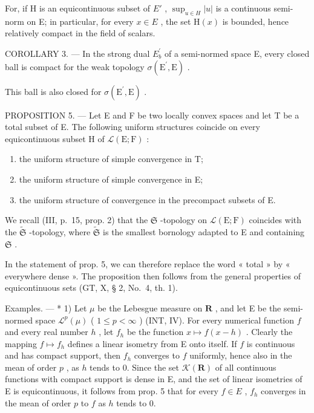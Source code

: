 For, if H is an equicontinuous subset of \(E'\) , \(\sup_{u\in H}|u|\) is a continuous semi-norm on E; in particular, for every \(x\in E\) , the set \(\mathrm{H}(x)\) is bounded, hence relatively compact in the field of scalars.

COROLLARY 3. --- In the strong dual \(E_{b}^{\prime}\) of a semi-normed space E, every closed ball is compact for the weak topology \(\sigma(\mathrm{E}^{\prime},\mathrm{E})\) .

This ball is also closed for \(\sigma(\mathrm{E}^{\prime},\mathrm{E})\) .

PROPOSITION 5. --- Let E and F be two locally convex spaces and let T be a total subset of E. The following uniform structures coincide on every equicontinuous subset H of \(\mathcal{L}(\mathrm{E};\mathrm{F})\) :

\begin{enumerate}
\def\labelenumi{\arabic{enumi})}
\item
  the uniform structure of simple convergence in T;
\item
  the uniform structure of simple convergence in E;
\item
  the uniform structure of convergence in the precompact subsets of E.
\end{enumerate}

We recall (III, p.~15, prop. 2) that the \(\mathfrak{S}\) -topology on \(\mathcal{L}(\mathrm{E};\mathrm{F})\) coincides with the \(\tilde{\mathfrak{S}}\) -topology, where \(\tilde{\mathfrak{S}}\) is the smallest bornology adapted to E and containing \(\mathfrak{S}\) .

In the statement of prop. 5, we can therefore replace the word « total » by « everywhere dense ». The proposition then follows from the general properties of equicontinuous sets (GT, X, § 2, No.~4, th. 1).

Examples. --- * 1) Let \(\mu\) be the Lebesgue measure on \(\mathbf{R}\) , and let E be the semi-normed space \(\mathcal{L}^p(\mu)\) ( \(1 \leqslant p < \infty\) ) (INT, IV). For every numerical function \(f\) and every real number \(h\) , let \(f_h\) be the function \(x \mapsto f(x - h)\) . Clearly the mapping \(f \mapsto f_h\) defines a linear isometry from E onto itself. If \(f\) is continuous and has compact support, then \(f_h\) converges to \(f\) uniformly, hence also in the mean of order \(p\) , as \(h\) tends to 0. Since the set \(\mathcal{K}(\mathbf{R})\) of all continuous functions with compact support is dense in E, and the set of linear isometries of E is equicontinuous, it follows from prop. 5 that for every \(f \in E\) , \(f_h\) converges in the mean of order \(p\) to \(f\) as \(h\) tends to 0.

